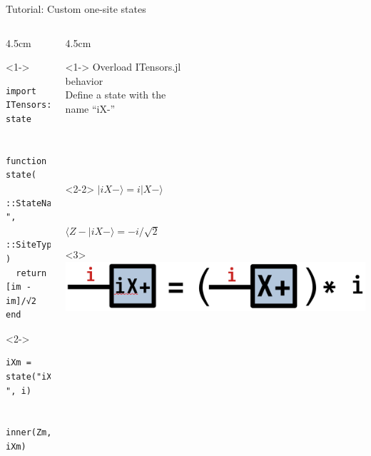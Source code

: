 \begin{frame}[fragile]{Tutorial: Custom one-site states}

\begin{columns}

\begin{column}{4.5cm}

\begin{onlyenv}<1->

\begin{lstlisting}[language=JuliaLocal, style=julia, basicstyle=\scriptsize\ttfamily]
import ITensors: state


function state(
  ::StateName"iX-",
  ::SiteType"S=1/2"
)
  return [im -im]/√2
end
\end{lstlisting}

\end{onlyenv}

\begin{onlyenv}<2->
\begin{lstlisting}[language=JuliaLocal, style=julia, basicstyle=\scriptsize\ttfamily]
iXm = state("iX-", i)


inner(Zm, iXm)
\end{lstlisting}
\end{onlyenv}

\end{column}

\begin{column}{4.5cm}

\begin{onlyenv}<1->
Overload ITensors.jl\\
behavior\\[\baselineskip]

Define a state with the\\
name ``iX-''\\
~\\
~\\
~\\
~\\
\end{onlyenv}

\begin{onlyenv}<2-2>
$|iX-\rangle = i|X-\rangle$ \\
~\\
~\\
$\langle Z-|iX-\rangle = -i/\sqrt{2}$
\end{onlyenv}

\begin{onlyenv}<3>
\includegraphics[width=1.0\textwidth]{
  slides/assets/iXp.png
}
\end{onlyenv}

\end{column}

\end{columns}

\end{frame}
